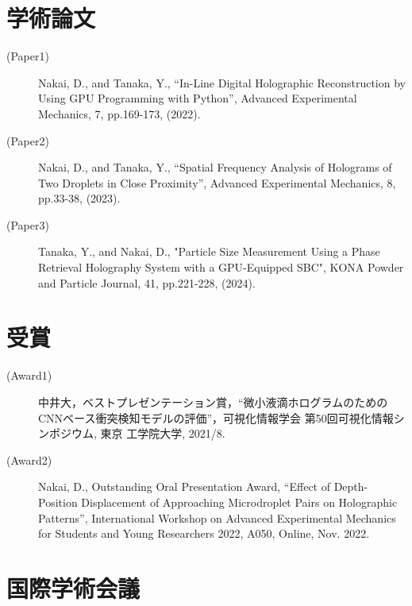 \section*{学術論文}

\begin{description}
    \item[(Paper1)] Nakai, D., and Tanaka, Y., “In-Line Digital Holographic Reconstruction by Using GPU Programming with Python”, Advanced Experimental Mechanics, 7, pp.169-173, (2022).
    \item[(Paper2)] Nakai, D., and Tanaka, Y., “Spatial Frequency Analysis of Holograms of Two Droplets in Close Proximity”, Advanced Experimental Mechanics, 8, pp.33-38, (2023).
    \item[(Paper3)] Tanaka, Y., and Nakai, D., "Particle Size Measurement Using a Phase Retrieval Holography System with a GPU-Equipped SBC", KONA Powder and Particle Journal, 41, pp.221-228, (2024).
\end{description}
\section*{受賞}
\begin{description}
    \item[(Award1)] 中井大，ベストプレゼンテーション賞，“微小液滴ホログラムのためのCNNベース衝突検知モデルの評価”，可視化情報学会 第50回可視化情報シンポジウム, 東京 工学院大学, 2021/8.
    \item[(Award2)] Nakai, D., Outstanding Oral Presentation Award, “Effect of Depth-Position Displacement of Approaching Microdroplet Pairs on Holographic Patterns”, International Workshop on Advanced Experimental Mechanics for Students and Young Researchers 2022, A050, Online, Nov. 2022.
\end{description}
\section*{国際学術会議}

